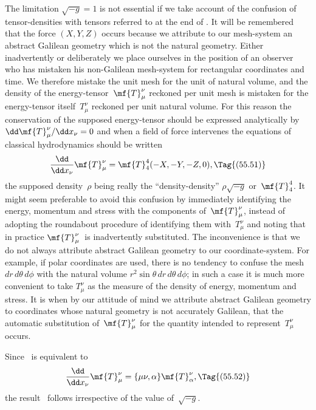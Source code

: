 \documentclass[12pt]{book}
\begin{document}
The limitation $\sqrt{-g} = 1$ is not essential if we take account of the confusion
of tensor\hyp{}densities with tensors referred to at the end of . It will
be remembered that the force $(X, Y, Z)$ occurs because we attribute to our
mesh\hyp{}system an abstract Galilean geometry which is not the natural geometry.
Either inadvertently or deliberately we place ourselves in the position
of an observer who has mistaken his non\hyp{}Galilean mesh\hyp{}system for rectangular
coordinates and time. We therefore mistake the unit mesh for the unit of
natural volume, and the density of the energy\hyp{}tensor~$\mf{T}_{\mu}^{\nu}$ reckoned per unit
mesh is mistaken for the energy\hyp{}tensor itself~$T_{\mu}^{\nu}$ reckoned per unit natural
volume. For this reason the conservation of the supposed energy\hyp{}tensor
should be expressed analytically by $\dd\mf{T}_{\mu}^{\nu}/\dd x_{\nu} = 0$ and when a field of force
intervenes the equations of classical hydrodynamics should be written
\[
\frac{\dd}{\dd x_{\nu}} \mf{T}_{\mu}^{\nu}
= \mf{T}_{4}^{4}(-X, -Y, -Z, 0),
\Tag{(55.51)}
\]
the supposed density~$\rho$ being really the ``density\hyp{}density'' $\rho\sqrt{-g}$ or~$\mf{T}_{4}^{4}$\footnotemark.\footnotetext
  {It might seem preferable to avoid this confusion by immediately identifying the energy,
  momentum and stress with the components of~$\mf{T}_{\mu}^{\nu}$, instead of adopting the roundabout procedure
  of identifying them with~$T_{\mu}^{\nu}$ and noting that in practice $\mf{T}_{\mu}^{\nu}$~is inadvertently substituted. The
  inconvenience is that we do not always attribute abstract Galilean geometry to our coordinate\hyp{}system.
  For example, if polar coordinates are used, there is no tendency to confuse the mesh
  $dr\, d\theta\, d\phi$ with the natural volume $r^{2} \sin\theta\, dr\, d\theta\, d\phi$; in such a case it is much more convenient to
  take $T_{\mu}^{\nu}$ as the measure of the density of energy, momentum and stress. It is when by our
  attitude of mind we attribute abstract Galilean geometry to coordinates whose natural geometry
  is not accurately Galilean, that the automatic substitution of~$\mf{T}_{\mu}^{\nu}$ for the quantity intended to
  represent~$T_{\mu}^{\nu}$ occurs.}

Since ~is equivalent to
\[
\frac{\dd}{\dd x_{\nu}} \mf{T}_{\mu}^{\nu}
= \{\mu\nu, \alpha\} \mf{T}_{\alpha}^{\nu},
\Tag{(55.52)}
\]
the result~ follows irrespective of the value of~$\sqrt{-g}$.
\end{document}
